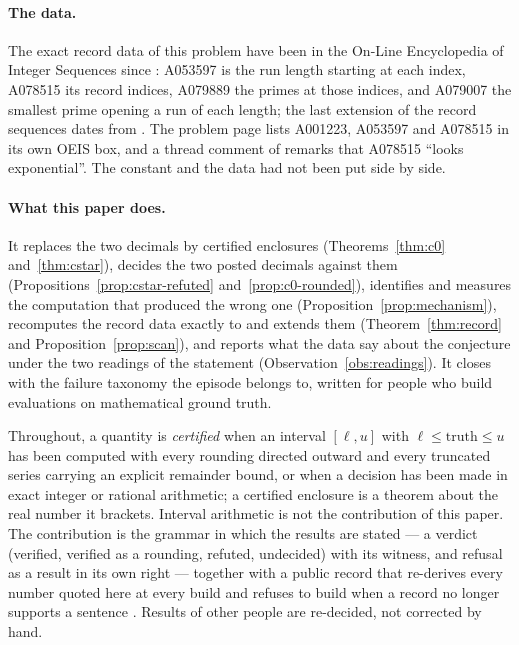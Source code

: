 \documentclass[11pt]{article}
\theoremstyle{definition}\newtheorem{observation}{Observation}
\begin{document}
\paragraph{The data.} The exact record data of this problem have been in the On-Line Encyclopedia of Integer Sequences since \OeisFirstYear{} \cite{OEIS}: A053597 is the run length starting at each index, A078515 its record indices, A079889 the primes at those indices, and A079007 the smallest prime opening a run of each length; the last extension of the record sequences dates from \OeisLastYear. The problem page lists A001223, A053597 and A078515 in its own OEIS box, and a thread comment of \ThreadDateData{} remarks that A078515 ``looks exponential''. The constant and the data had not been put side by side.

\paragraph{What this paper does.} It replaces the two decimals by certified enclosures (Theorems~\ref{thm:c0} and~\ref{thm:cstar}), decides the two posted decimals against them (Propositions~\ref{prop:cstar-refuted} and~\ref{prop:c0-rounded}), identifies and measures the computation that produced the wrong one (Proposition~\ref{prop:mechanism}), recomputes the record data exactly to \HLimit{} and extends them (Theorem~\ref{thm:record} and Proposition~\ref{prop:scan}), and reports what the data say about the conjecture under the two readings of the statement (Observation~\ref{obs:readings}). It closes with the failure taxonomy the episode belongs to, written for people who build evaluations on mathematical ground truth.

Throughout, a quantity is \emph{certified} when an interval $[\ell,u]$ with $\ell\le\text{truth}\le u$ has been computed with every rounding directed outward and every truncated series carrying an explicit remainder bound, or when a decision has been made in exact integer or rational arithmetic; a certified enclosure is a theorem about the real number it brackets. Interval arithmetic is not the contribution of this paper. The contribution is the grammar in which the results are stated --- a verdict (verified, verified as a rounding, refuted, undecided) with its witness, and refusal as a result in its own right --- together with a public record that re-derives every number quoted here at every build and refuses to build when a record no longer supports a sentence \cite{Repo}. Results of other people are re-decided, not corrected by hand.
\end{document}
